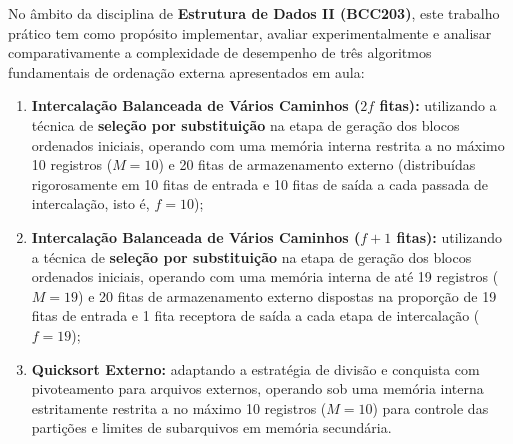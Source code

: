 \documentclass[12pt,a4paper]{article}
\begin{document}
No âmbito da disciplina de \textbf{Estrutura de Dados II (BCC203)}, este trabalho prático tem como propósito implementar, avaliar experimentalmente e analisar comparativamente a complexidade de desempenho de três algoritmos fundamentais de ordenação externa apresentados em aula:
\begin{enumerate}
    \item \textbf{Intercalação Balanceada de Vários Caminhos ($2f$ fitas):} utilizando a técnica de \textbf{seleção por substituição} na etapa de geração dos blocos ordenados iniciais, operando com uma memória interna restrita a no máximo 10 registros ($M = 10$) e 20 fitas de armazenamento externo (distribuídas rigorosamente em 10 fitas de entrada e 10 fitas de saída a cada passada de intercalação, isto é, $f = 10$);
    \item \textbf{Intercalação Balanceada de Vários Caminhos ($f+1$ fitas):} utilizando a técnica de \textbf{seleção por substituição} na etapa de geração dos blocos ordenados iniciais, operando com uma memória interna de até 19 registros ($M = 19$) e 20 fitas de armazenamento externo dispostas na proporção de 19 fitas de entrada e 1 fita receptora de saída a cada etapa de intercalação ($f = 19$);
    \item \textbf{Quicksort Externo:} adaptando a estratégia de divisão e conquista com pivoteamento para arquivos externos, operando sob uma memória interna estritamente restrita a no máximo 10 registros ($M = 10$) para controle das partições e limites de subarquivos em memória secundária.
\end{enumerate}
\end{document}
